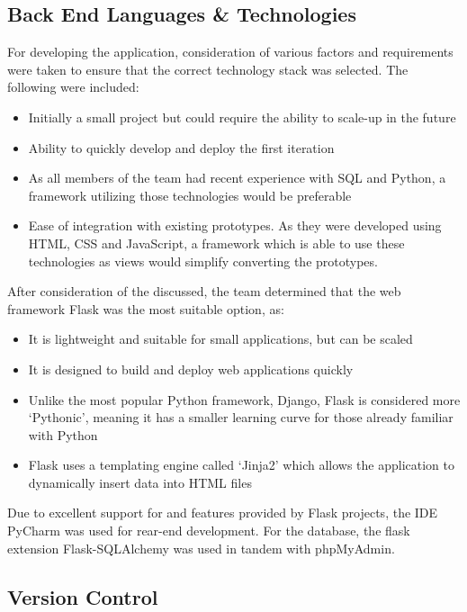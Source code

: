 \documentclass[11pt, english]{article}
\begin{document}
	\subsection{Back End Languages \& Technologies}

	For developing the application, consideration of various factors and requirements were taken to ensure that the correct technology stack was selected. The following were included:

	\begin{itemize}
	\setlength\itemsep{0cm}
		\item Initially a small project but could require the ability to scale-up in the future
		\item Ability to quickly develop and deploy the first iteration
		\item As all members of the team had recent experience with SQL and Python, a framework utilizing those technologies would be preferable
		\item Ease of integration with existing prototypes. As they were developed using HTML, CSS and JavaScript, a framework which is able to use these technologies as views would simplify converting the prototypes.
	\end{itemize}

	After consideration of the discussed, the team determined that the web framework Flask was the most suitable option, as:

	\begin{itemize}
	\setlength\itemsep{0cm}
		\item It is lightweight and suitable for small applications, but can be scaled
		\item It is designed to build and deploy web applications quickly
		\item Unlike the most popular Python framework, Django, Flask is considered more `Pythonic', meaning it has a smaller learning curve for those already familiar with Python
		\item Flask uses a templating engine called `Jinja2' which allows the application to dynamically insert data into HTML files
	\end{itemize}

	Due to excellent support for and features provided by Flask projects, the IDE PyCharm was used for rear-end development. For the database, the flask extension Flask-SQLAlchemy was used in tandem with phpMyAdmin.

	\subsection{Version Control}
\end{document}
